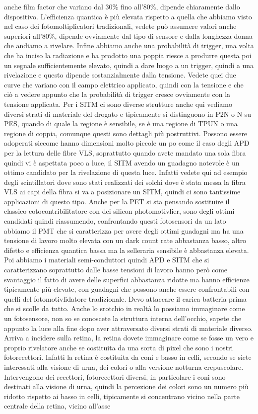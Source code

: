 anche film factor che variano dal 30\% fino all'80\%, dipende chiaramente dallo dispositivo. L'efficienza quantica è più elevata rispetto a quella che abbiamo visto nel caso dei fotomoltiplicatori tradizionali, vedete può assumere valori anche superiori all'80\%, dipende ovviamente dal tipo di sensore e dalla longhezza donna che andiamo a rivelare. Infine abbiamo anche una probabilità di trigger, una volta che ha inciso la radiazione e ha prodotto una poppia riesce a produrre questa poi un segnale sufficientemente elevato, quindi a dare luogo a un trigger, quindi a una rivelazione e questo dipende sostanzialmente dalla tensione. Vedete quei due curve che variano con il campo elettrico applicato, quindi con la tensione e che ciò a vedere appunto che la probabilità di trigger cresce ovviamente con la tensione applicata. Per i SITM ci sono diverse strutture anche qui vediamo diversi strati di materiale del drogato e tipicamente si distinguono in P2N o N su PES, quando di quale la regione è sensibile, se è una regione di TPUN o una regione di coppia, comunque questi sono dettagli più postruttivi. Possono essere adoperati siccome hanno dimensioni molto piccole un po come il caso degli APD per la lettura delle fibre VLS, soprattutto quando avete mandato una sola fibra quindi vi è aspettata poco a luce, il SITM avendo un guadagno notevole è un ottimo candidato per la rivelazione di questa luce. Infatti vedete qui ad esempio degli scintillatori dove sono stati realizzati dei solchi dove è stata messa la fibra VLS ai capi della fibra si va a posizionare un SITM, quindi ci sono tantissime applicazioni di questo tipo. Anche per la PET si sta pensando sostituire il classico cotocontribilitatore con dei silicon photomotivlier, sono degli ottimi candidati quindi riassumendo, confrontando questi fotosensori da un lato abbiamo il PMT che si caratterizza per avere degli ottimi guadagni ma ha una tensione di lavoro molto elevata con un dark count rate abbastanza basso, altro difetto e efficienza quantica bassa ma la selleraria sensibile è abbastanza elevata. Poi abbiamo i materiali semi-conduttori quindi APD e SITM che si caratterizzano soprattutto dalle basse tensioni di lavoro hanno però come svantaggio il fatto di avere delle superfici abbastanza ridotte ma hanno efficienze tipicamente più elevate, con guadagni che possono anche essere confrontabili con quelli del fotomotivlidatore tradizionale. Devo attaccare il carica batteria prima che si scolle da tutto. Anche lo srotchio in realtà lo possiamo immaginare come un fotosensore, non so se conoscete la struttura interna dell'occhio, sapete che appunto la luce alla fine dopo aver attraversato diversi strati di materiale diverso. Arriva a incidere sulla retina, la retina dovete immaginare come se fosse un vero e proprio rivelatore anche se costituita da una sorta di pixel che sono i nostri fotorecettori. Infatti la retina è costituita da coni e basso in celli, secondo se siete interessati alla visione di urna, dei colori o alla versione notturna crepuscolare. Intervengono dei recettori, fotorecettori diversi, in particolare i coni sono destinati alla visione di urna, quindi la percezione dei colori sono un numero più ridotto rispetto ai basso in celli, tipicamente si concentrano vicino nella parte centrale della retina, vicino all'asse 
